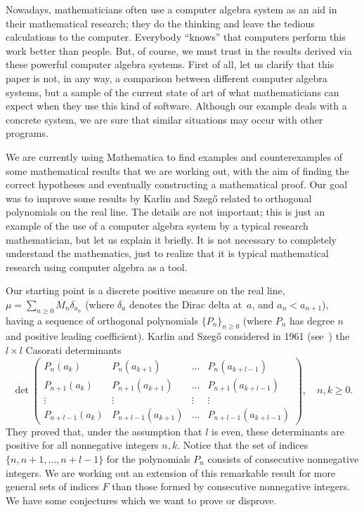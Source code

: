 \documentclass[12pt]{article}
\begin{document}
Nowadays, mathematicians often use a computer algebra system as an aid in their mathematical research; they do the thinking and leave the tedious calculations to the computer. Everybody ``knows'' that computers perform this work better than people. But, of course, we must trust in the results derived via these powerful computer algebra systems. First of all, let us clarify that this paper is not, in any way, a comparison between different computer algebra systems, but a sample of the current state of art of what mathematicians can expect when they use this kind of software. Although our example deals with a concrete system, we are sure that similar situations may occur with other programs.

We are currently using Mathematica to find examples and counterexamples of some mathematical results that we are working out, with the aim of finding the correct hypotheses and eventually constructing a mathematical proof. Our goal was to improve some results by Karlin and Szeg\H{o} \cite{KS} related to orthogonal polynomials on the real line. The details are not important; this is just an example of the use of a computer algebra system by a typical research mathematician, but let us explain it briefly. It is not necessary to completely understand the mathematics, just to realize that it is typical mathematical research using computer algebra as a tool.

Our starting point is a discrete positive measure on the real line, $\mu = \sum_{n\ge0} M_n \delta_{a_n}$ (where $\delta_a$ denotes the Dirac delta at~$a$, and $a_n<a_{n+1}$), having a sequence of orthogonal polynomials $\{P_n\}_{n\ge0}$ (where $P_n$ has degree $n$ and positive leading coefficient). Karlin and Szeg\H{o} considered in 1961 (see~\cite{KS})
the $l\times l$ Casorati determinants
\begin{equation}
\label{eq:det}
\det
\begin{pmatrix}
   P_{n}(a_k) & P_{n}(a_{k+1})& \dots & P_{n}(a_{k+l-1}) \\
   P_{n+1}(a_k) & P_{n+1}(a_{k+1})& \dots & P_{n+1}(a_{k+l-1}) \\
   \vdots & \vdots& \vdots & \vdots \\
   P_{n+l-1}(a_k) & P_{n+l-1}(a_{k+1})& \dots & P_{n+l-1}(a_{k+l-1})
\end{pmatrix},\quad n,k\ge 0 .
\end{equation}
They proved that, under the assumption that $l$ is even, these determinants are positive for all nonnegative integers $n, k$. Notice that the set of indices $\{n,n+1,\ldots , n+l-1\}$ for the polynomials $P_n$ consists of consecutive nonnegative integers. We are working out an extension of this remarkable result for more general sets of indices $F$ than those formed by consecutive nonnegative integers. We have some conjectures which we want to prove or disprove.
\end{document}
